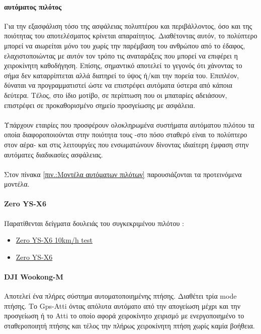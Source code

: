 \documentclass[a4paper, 12pt, twoside]{report}
\begin{document}
{{{{{{			\paragraph{αυτόματος πιλότος}{Για την εξασφάλιση τόσο της ασφάλειας πολυπτέρου και περιβάλλοντος, όσο και της ποιότητας του αποτελέσματος κρίνεται απαραίτητος. Διαθέτοντας αυτόν, το πολύπτερο μπορεί να αιωρείται μόνο του χωρίς την παρέμβαση του ανθρώπου από το έδαφος, ελαχιστοποιώντας με αυτόν τον τρόπο τις αναταράξεις που μπορεί να επιφέρει η χειροκίνητη καθοδήγηση. Επίσης, σημαντικό αποτελεί το γεγονός ότι χάνοντας το σήμα δεν καταρρίπτεται αλλά διατηρεί το ύψος ή/και την πορεία του. Επιπλέον, δύναται να προγραμματιστεί ώστε να επιστρέφει αυτόματα ύστερα από κάποια δεύτερα. Τέλος, στο ίδιο μοτίβο, σε περίπτωση που οι μπαταρίες αδειάσουν, επιστρέφει σε προκαθορισμένο σημείο προσγείωσης με ασφάλεια.
			}
			\paragraph{}{Υπάρχουν εταιρίες που προσφέρουν ολοκληρωμένα συστήματα αυτόματου πιλότου τα οποία διαφοροποιούνται στην ποιότητα τους -στο πόσο σταθερό είναι το πολύπτερο στον αέρα- και στις λειτουργίες που ενσωματώνουν δίνοντας ιδιαίτερη έμφαση στην αυτόματες διαδικασίες ασφάλειας.
			}
			\paragraph{}{Στον πίνακα \ref{πιν.:Μοντέλα αυτόματων πιλότων} παρουσιάζονται τα προτεινόμενα μοντέλα.
			}
			
			\paragraph{Zero YS-X6}{Παρατίθενται δείγματα δουλειάς του συγκεκριμένου πιλότου :
				\begin{itemize}
					\item \href{http://www.youtube.com/watch?v=r1_O_VvFZ1U}{Zero YS-X6 10km/h test}
					\item \href{http://www.youtube.com/watch?v=JRiiGby-e-4}{Zero YS-X6}					
				\end{itemize}
			}
			
			\paragraph{DJI Wookong-M}{Αποτελεί ένα πλήρες σύστημα αυτοματοποιημένης πτήσης. Διαθέτει τρία mode πτήσης. Το Gps-Atti όντας απόλυτα αυτόματο από την απογείωση μέχρι και την προσγείωση ή το Atti το οποίο αφορά χειροκίνητο χειρισμό με ενεργοποιημένο το σταθεροποιητή πτήσης και τέλος την πλήρως χειροκίνητη πτήση χωρίς καμία βοήθεια.
			}
}}}}}}
\end{document}
